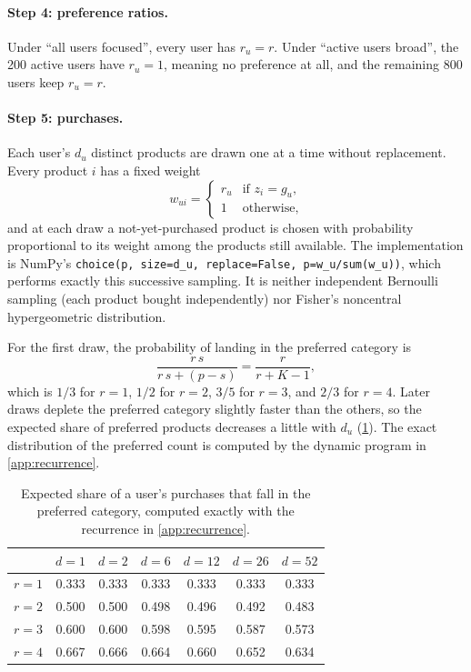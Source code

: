 \documentclass[12pt]{article}
\begin{document}
\paragraph{Step 4: preference ratios.} Under ``all users focused'', every user has $r_u=r$. Under ``active users broad'', the 200 active users have $r_u=1$, meaning no preference at all, and the remaining 800 users keep $r_u=r$.

\paragraph{Step 5: purchases.} Each user's $d_u$ distinct products are drawn one at a time without replacement. Every product $i$ has a fixed weight
\[
  w_{ui}=\begin{cases} r_u & \text{if } z_i=g_u,\\ 1 & \text{otherwise,}\end{cases}
\]
and at each draw a not-yet-purchased product is chosen with probability proportional to its weight among the products still available. The implementation is NumPy's \texttt{choice(p, size=d\_u, replace=False, p=w\_u/sum(w\_u))}, which performs exactly this successive sampling. It is neither independent Bernoulli sampling (each product bought independently) nor Fisher's noncentral hypergeometric distribution.

For the first draw, the probability of landing in the preferred category is
\[
  \frac{r\,s}{r\,s+(p-s)}=\frac{r}{r+K-1},
\]
which is $1/3$ for $r=1$, $1/2$ for $r=2$, $3/5$ for $r=3$, and $2/3$ for $r=4$. Later draws deplete the preferred category slightly faster than the others, so the expected share of preferred products decreases a little with $d_u$ (\cref{tab:gen-share}). The exact distribution of the preferred count is computed by the dynamic program in \cref{app:recurrence}.

\begin{table}[ht]
  \centering
  \caption{Expected share of a user's purchases that fall in the preferred category, computed exactly with the recurrence in \cref{app:recurrence}.}
  \label{tab:gen-share}
  \small
  \begin{tabular}{@{}lcccccc@{}}
    \toprule
    & $d=1$ & $d=2$ & $d=6$ & $d=12$ & $d=26$ & $d=52$ \\
    \midrule
    $r=1$ & 0.333 & 0.333 & 0.333 & 0.333 & 0.333 & 0.333 \\
    $r=2$ & 0.500 & 0.500 & 0.498 & 0.496 & 0.492 & 0.483 \\
    $r=3$ & 0.600 & 0.600 & 0.598 & 0.595 & 0.587 & 0.573 \\
    $r=4$ & 0.667 & 0.666 & 0.664 & 0.660 & 0.652 & 0.634 \\
    \bottomrule
  \end{tabular}
\end{table}
\end{document}
